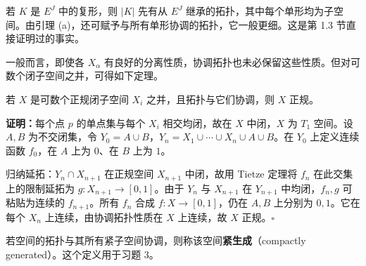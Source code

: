 若 $K$ 是 $E^J$ 中的复形，则 $|K|$ 先有从 $E^J$ 继承的拓扑，其中每个单形均为子空间。由引理 (a)，还可赋予与所有单形协调的拓扑，它一般更细。这是第 1.3 节直接证明过的事实。

一般而言，即使各 $X_\alpha$ 有良好的分离性质，协调拓扑也未必保留这些性质。但对可数个闭子空间之并，可得如下定理。

若 $X$ 是可数个正规闭子空间 $X_i$ 之并，且拓扑与它们协调，则 $X$ 正规。

\textbf{证明：}每个点 $p$ 的单点集与每个 $X_i$ 相交均闭，故在 $X$ 中闭，$X$ 为 $T_1$ 空间。设 $A,B$ 为不交闭集，令 $Y_0=A\cup B$，$Y_n=X_1\cup\cdots\cup X_n\cup A\cup B$。在 $Y_0$ 上定义连续函数 $f_0$，在 $A$ 上为 $0$、在 $B$ 上为 $1$。

归纳延拓：$Y_n\cap X_{n+1}$ 在正规空间 $X_{n+1}$ 中闭，故用 Tietze 定理将 $f_n$ 在此交集上的限制延拓为 $g:X_{n+1}\to[0,1]$。由于 $Y_n$ 与 $X_{n+1}$ 在 $Y_{n+1}$ 中均闭，$f_n,g$ 可粘贴为连续的 $f_{n+1}$。所有 $f_n$ 合成 $f:X\to[0,1]$，仍在 $A,B$ 上分别为 $0,1$。它在每个 $X_n$ 上连续，由协调拓扑性质在 $X$ 上连续，故 $X$ 正规。\hfill$\square$

若空间的拓扑与其所有紧子空间协调，则称该空间\textbf{紧生成}（compactly generated）。这个定义用于习题 3。

